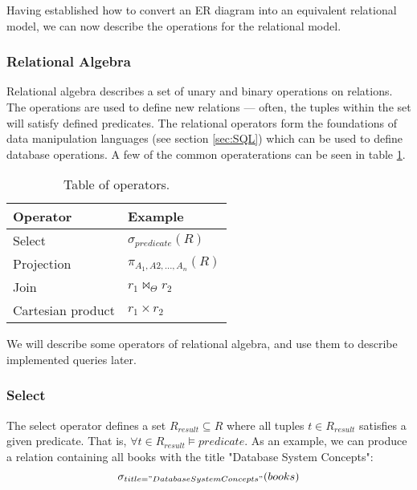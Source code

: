 
Having established how to convert an ER diagram into an equivalent relational model, we can now describe the operations for the relational model.

\subsubsection{Relational Algebra}\label{sec:relationalAlgebra}
Relational algebra describes a set of unary and binary operations on relations.
The operations are used to define new relations --- often, the tuples within the set will satisfy defined predicates.
The relational operators form the foundations of data manipulation languages (see section \ref{sec:SQL}) which can be used to define database operations\cite{DBSBook}.
A few of the common operaterations can be seen in table \ref{Relational algebra operators}.


\begin{table}[h]
    \centering
    \begin{tabular}{|ll|}
    \hline 
    \multicolumn{1}{|l|}{\textbf{Operator}}          & \multicolumn{1}{l|}{\textbf{Example}}   \\ \hline
    \multicolumn{1}{|l|}{Select}                     & \multicolumn{1}{l|}{$\sigma_{predicate}(R)$}            \\ \hline
    \multicolumn{1}{|l|}{Projection}                 & \multicolumn{1}{l|}{$\pi_{A_1, A2,...,A_n}(R)$}           \\ \hline
    \multicolumn{1}{|l|}{Join}                 & \multicolumn{1}{l|}{$r_1 \Join_\Theta r_2$}             \\ \hline
    \multicolumn{1}{|l|}{Cartesian product}          & \multicolumn{1}{l|}{$r_1\times r_2$}              \\ \hline
    \end{tabular}
    \caption{Table of operators.}
    \label{Relational algebra operators}
\end{table}

We will describe some operators of relational algebra, and use them to describe implemented queries later.
\subsubsection*{Select}
The select operator defines a set $R_{result}\subseteq R$ where all tuples $t \in R_{result}$ satisfies a given predicate\cite{DBSBook}.
That is, $\forall t \in R_{result} \vDash predicate$.
As an example, we can produce a relation containing all books with the title "Database System Concepts":
$$\sigma_{title = "Database System Concepts"}(books)$$
